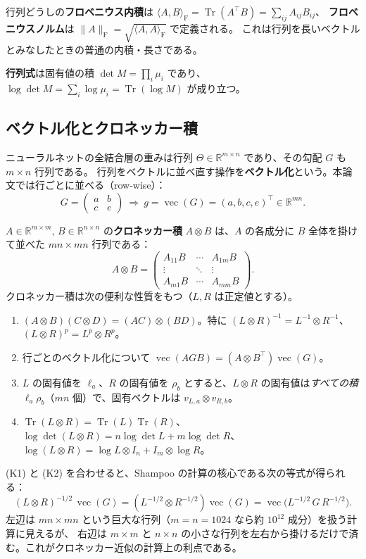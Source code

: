 \documentclass[a4paper,11pt]{ltjsarticle}
\theoremstyle{definition}
\theoremstyle{plain}
\newcommand{\R}{\mathbb{R}}
\DeclareMathOperator{\Tr}{Tr}
\DeclareMathOperator{\vecop}{vec}
\newcommand{\ip}[2]{\langle #1,#2\rangle}
\newcommand{\norm}[1]{\lVert #1\rVert}
\newcommand{\Fro}{\mathrm{F}}
\newcommand{\T}{^{\top}}
\begin{document}
行列どうしの\textbf{フロベニウス内積}は $\ip{A}{B}_\Fro = \Tr(A\T B) = \sum_{ij}A_{ij}B_{ij}$、
\textbf{フロベニウスノルム}は $\norm{A}_\Fro = \sqrt{\ip{A}{A}_\Fro}$ で定義される。
これは行列を長いベクトルとみなしたときの普通の内積・長さである。

\textbf{行列式}は固有値の積 $\det M = \prod_i\mu_i$ であり、$\log\det M = \sum_i\log\mu_i = \Tr(\log M)$ が成り立つ。

\subsection{ベクトル化とクロネッカー積}\label{sec:kron}

ニューラルネットの全結合層の重みは行列 $\Theta\in\R^{m\times n}$ であり、その勾配 $G$ も $m\times n$ 行列である。
行列をベクトルに並べ直す操作を\textbf{ベクトル化}という。本論文では行ごとに並べる（row-wise）：
\[
  G = \begin{pmatrix} a & b\\ c & e\end{pmatrix}
  \ \Longrightarrow\ 
  g = \vecop(G) = (a,b,c,e)\T \in \R^{mn}.
\]

$A\in\R^{m\times m}$, $B\in\R^{n\times n}$ の\textbf{クロネッカー積} $A\otimes B$ は、$A$ の各成分に $B$ 全体を掛けて並べた $mn\times mn$ 行列である：
\[
  A\otimes B = \begin{pmatrix} A_{11}B & \cdots & A_{1m}B\\ \vdots & \ddots & \vdots\\ A_{m1}B & \cdots & A_{mm}B\end{pmatrix}.
\]
クロネッカー積は次の便利な性質をもつ（$L, R$ は正定値とする）。
\begin{enumerate}[label=(K\arabic*)]
  \item $(A\otimes B)(C\otimes D) = (AC)\otimes(BD)$。特に $(L\otimes R)^{-1} = L^{-1}\otimes R^{-1}$、$(L\otimes R)^{p} = L^p\otimes R^p$。
  \item 行ごとのベクトル化について $\vecop(AGB) = (A\otimes B\T)\vecop(G)$。
  \item $L$ の固有値を $\ell_a$、$R$ の固有値を $\rho_b$ とすると、$L\otimes R$ の固有値は\emph{すべての積} $\ell_a\rho_b$（$mn$ 個）で、固有ベクトルは $v_{L,a}\otimes v_{R,b}$。
  \item $\Tr(L\otimes R) = \Tr(L)\Tr(R)$、$\log\det(L\otimes R) = n\log\det L + m\log\det R$、
        $\log(L\otimes R) = \log L\otimes I_n + I_m\otimes\log R$。
\end{enumerate}
(K1) と (K2) を合わせると、Shampoo の計算の核心である次の等式が得られる：
\begin{equation}\label{eq:kron-precond}
  (L\otimes R)^{-1/2}\,\vecop(G) = (L^{-1/2}\otimes R^{-1/2})\vecop(G) = \vecop\bigl(L^{-1/2}\,G\,R^{-1/2}\bigr).
\end{equation}
左辺は $mn\times mn$ という巨大な行列（$m=n=1024$ なら約 $10^{12}$ 成分）を扱う計算に見えるが、
右辺は $m\times m$ と $n\times n$ の小さな行列を左右から掛けるだけで済む。これがクロネッカー近似の計算上の利点である。
\end{document}

